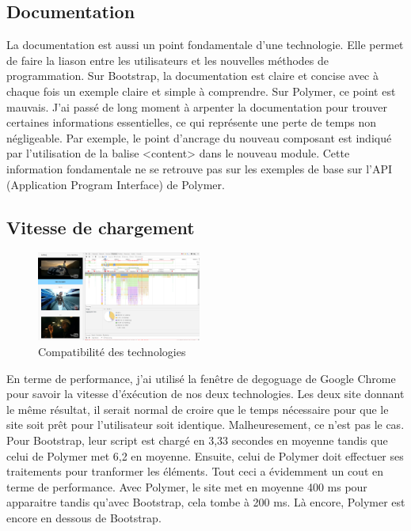 \documentclass{article}
\begin{document}
\subsection{Documentation}

La documentation est aussi un point fondamentale d'une technologie. Elle permet de faire la liason entre les utilisateurs et les nouvelles m\'ethodes de programmation. Sur Bootstrap, la documentation est claire et concise avec \`a chaque fois un exemple claire et simple \`a comprendre. Sur Polymer, ce point est mauvais. J'ai pass\'e de long moment \`a arpenter la documentation pour trouver certaines informations essentielles, ce qui repr\'esente une perte de temps non n\'egligeable. Par exemple, le point d'ancrage du nouveau composant est indiqu\'e par l'utilisation de la balise <content> dans le nouveau module. Cette information fondamentale ne se retrouve pas sur les exemples de base sur l'API (Application Program Interface) de Polymer.

\subsection{Vitesse de chargement}

\begin{figure}
  \vspace{-25pt}
  \begin{center}
    \includegraphics[width=0.48\textwidth]{p15}
  \end{center}
  \vspace{-20pt}
  \caption{Compatibilit\'e des technologies}
  \vspace{-10pt}
\end{figure}

En terme de performance, j'ai utilis\'e la fen\^etre de degoguage de Google Chrome pour savoir la vitesse d'\'ex\'ecution de nos deux technologies. Les deux site donnant le m\^eme r\'esultat, il serait normal de croire que le temps n\'ecessaire pour que le site soit pr\^et pour l'utilisateur soit identique. Malheuresement, ce n'est pas le cas. Pour Bootstrap, leur script est charg\'e en 3,33 secondes en moyenne tandis que celui de Polymer met 6,2 en moyenne. Ensuite, celui de Polymer doit effectuer ses traitements pour tranformer les \'el\'ements. Tout ceci a \'evidemment un cout en terme de performance. Avec Polymer, le site met en moyenne 400 ms pour apparaitre tandis qu'avec Bootstrap, cela tombe \`a 200 ms. L\`a encore, Polymer est encore en dessous de Bootstrap.
\end{document}
